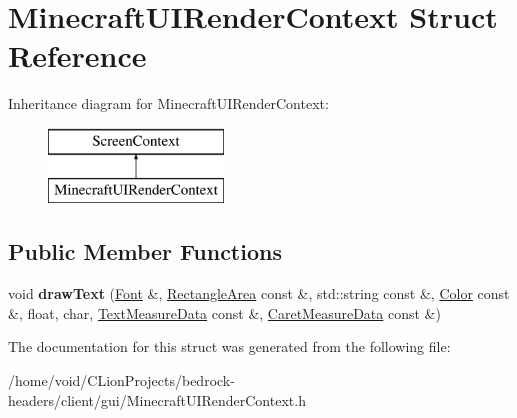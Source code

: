 \hypertarget{struct_minecraft_u_i_render_context}{}\section{Minecraft\+U\+I\+Render\+Context Struct Reference}
\label{struct_minecraft_u_i_render_context}
Inheritance diagram for Minecraft\+U\+I\+Render\+Context\+:\begin{figure}[H]
\begin{center}
\leavevmode
\includegraphics[height=2.000000cm]{struct_minecraft_u_i_render_context}
\end{center}
\end{figure}
\subsection*{Public Member Functions}
\begin{DoxyCompactItemize}
\item 
\mbox{\label{struct_minecraft_u_i_render_context_a3216b232ad824a7efeb9e74928023b84}} 
void {\bfseries draw\+Text} (\mbox{\hyperlink{struct_font}{Font}} \&, \mbox{\hyperlink{struct_rectangle_area}{Rectangle\+Area}} const \&, std\+::string const \&, \mbox{\hyperlink{struct_color}{Color}} const \&, float, char, \mbox{\hyperlink{struct_text_measure_data}{Text\+Measure\+Data}} const \&, \mbox{\hyperlink{struct_caret_measure_data}{Caret\+Measure\+Data}} const \&)
\end{DoxyCompactItemize}


The documentation for this struct was generated from the following file\+:\begin{DoxyCompactItemize}
\item 
/home/void/\+C\+Lion\+Projects/bedrock-\/headers/client/gui/Minecraft\+U\+I\+Render\+Context.\+h\end{DoxyCompactItemize}
